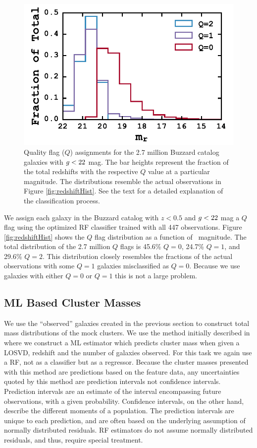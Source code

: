 \begin{figure}
	\includegraphics[width=\textwidth]{figures/buzzardQHist.pdf} 
	\caption{Quality flag ($Q$) assignments for the 2.7 million Buzzard catalog galaxies with $\hbox{$g$}< 22$ mag. The bar heights represent the fraction of the total redshifts with the respective $Q$ value at a particular magnitude. The distributions resemble the actual observations in Figure \ref{fig:redshiftHist}. See the text for a detailed explanation of the classification process.} \label{fig:buzzardHist} 
\end{figure}

We assign each galaxy in the Buzzard catalog with $z<0.5$ and $\hbox{$g$}< 22$ mag a $Q$ flag using the optimized RF classifier trained with all 447 observations. Figure \ref{fig:redshiftHist} shows the $Q$ flag distribution as a function of \sdssr\ magnitude. The total distribution of the 2.7 million $Q$ flags is 45.6\% $Q=0$, 24.7\% $Q=1$, and 29.6\% $Q=2$. This distribution closely resembles the fractions of the actual observations with some $Q=1$ galaxies misclassified as $Q=0$. Because we use galaxies with either $Q=0$ or $Q=1$ this is not a large problem. 

\subsection{ML Based Cluster Masses}\label{sec:ML based cluster masses}
We use the ``observed'' galaxies created in the previous section to construct total mass distributions of the mock clusters. We use the method initially described in  where we construct a ML estimator which predicts cluster mass when given a LOSVD, redshift and the number of galaxies observed. For this task we again use a RF, not as a classifier but as a regressor. Because the cluster masses presented with this method are predictions based on the feature data, any uncertainties quoted by this method are prediction intervals not confidence intervals. Prediction intervals are an estimate of the interval encompassing future observations, with a given probability. Confidence intervals, on the other hand, describe the different moments of a population. The prediction intervals are unique to each prediction, and are often based on the underlying assumption of normally distributed residuals. RF estimators do not assume normally distributed residuals, and thus, require special treatment.  

